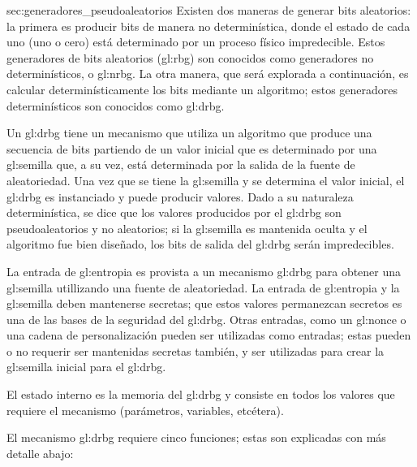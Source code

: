 %
%

  {sec:generadores_pseudoaleatorios}{%
  }%
%
Existen dos maneras de generar bits aleatorios: la primera es producir bits
de manera no determinística, donde el estado de cada uno (uno o cero) está
determinado por un proceso físico impredecible. Estos generadores de bits
aleatorios (\gls{gl:rbg}) son conocidos como generadores no determinísticos, o
\gls{gl:nrbg}. La otra manera, que será explorada a continuación, es calcular
determinísticamente los bits mediante un algoritmo; estos generadores
determinísticos son conocidos como \gls{gl:drbg}.

Un \gls{gl:drbg} tiene un mecanismo que utiliza un algoritmo que produce una
secuencia de bits partiendo de un valor inicial que es determinado por una
\gls{gl:semilla} que, a su vez, está determinada por la salida de la fuente de
aleatoriedad. Una vez que se tiene la \gls{gl:semilla} y se determina el valor
inicial, el \gls{gl:drbg} es instanciado y puede producir valores. Dado a su
naturaleza determinística, se dice que los valores producidos por el
\gls{gl:drbg} son pseudoaleatorios y no aleatorios; si la \gls{gl:semilla} es
mantenida oculta y el algoritmo fue bien diseñado, los bits de salida del
\gls{gl:drbg} serán impredecibles.


La entrada de \gls{gl:entropia} es provista a un mecanismo \gls{gl:drbg} para
obtener una \gls{gl:semilla} utillizando una fuente de aleatoriedad. La entrada
de \gls{gl:entropia} y la \gls{gl:semilla} deben mantenerse secretas; que estos
valores permanezcan secretos es una de las bases de la seguridad del
\gls{gl:drbg}. Otras entradas, como un \gls{gl:nonce} o una cadena de
personalización pueden ser utilizadas como entradas; estas pueden o no requerir
ser mantenidas secretas también, y ser utilizadas para crear la \gls{gl:semilla}
inicial para el \gls{gl:drbg}.

El estado interno es la memoria del \gls{gl:drbg} y consiste en todos los
valores que requiere el mecanismo (parámetros, variables, etcétera).

El mecanismo \gls{gl:drbg} requiere cinco funciones; estas son explicadas con
más detalle abajo:

